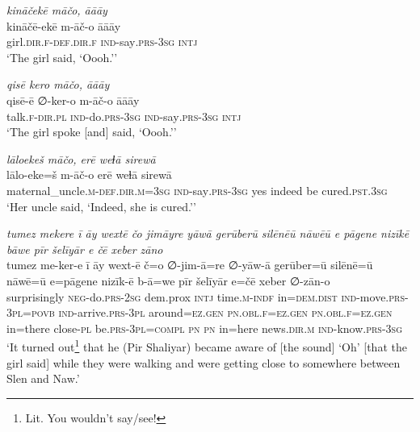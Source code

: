 \ea \label{ŽP.172}
\textit{kināčekē māčo, āāāy} \\ 
\gll kināčē-ekē m-āč-o āāāy \\ 
 girl\textsc{.dir}\textsc{.f}\textsc{-def}\textsc{.dir}\textsc{.f} \textsc{ind-}say\textsc{.prs}\textsc{-3sg} \textsc{intj} \\ 
\glt `The girl said, ‘Oooh.’'
\z 
 
\ea \label{ŽP.173}
\textit{qisē kero māčo, āāāy} \\ 
\gll qisē-ē ∅-ker-o m-āč-o āāāy \\ 
 talk\textsc{.f}\textsc{-dir}\textsc{.pl} \textsc{ind-}do\textsc{.prs}\textsc{-3sg} \textsc{ind-}say\textsc{.prs}\textsc{-3sg} \textsc{intj} \\ 
\glt `The girl spoke [and] said, ‘Oooh.’'
\z 
 
\ea \label{ŽP.174}
\textit{lāloekeš māčo, erē weɫā sirewā} \\ 
\gll lālo-eke=š m-āč-o erē weɫā sirewā \\ 
 maternal\_uncle\textsc{.m}\textsc{-def}\textsc{.dir}\textsc{.m}\textsc{=3sg} \textsc{ind-}say\textsc{.prs}\textsc{-3sg} yes indeed be cured\textsc{.pst}\textsc{.3sg} \\ 
\glt `Her uncle said, ‘Indeed, she is cured.’'
\z 
 
\ea \label{ŽP.175}
\textit{tumez mekere ī āy wextē čo jimāyre yāwā gerūberū silēnēū nāwēū e pāgene nizīkē bāwe pīr šelīyār e čē xeber zāno} \\ 
\gll tumez me-ker-e ī āy wext-ē č=o ∅-jim-ā=re ∅-yāw-ā gerūber=ū silēnē=ū nāwē=ū e=pāgene nizīk-ē b-ā=we pīr šelīyār e=čē xeber ∅-zān-o \\ 
 surprisingly \textsc{neg-}do\textsc{.prs}-\textsc{2sg} dem.prox \textsc{intj} time\textsc{.m}\textsc{-indf} in=\textsc{dem.dist} \textsc{ind-}move\textsc{.prs}\textsc{-3pl}\textsc{=\textsc{povb}} \textsc{ind-}arrive\textsc{.prs}\textsc{-3pl} around\textsc{\textsc{=ez.gen}} \textsc{pn}\textsc{.obl}\textsc{.f}\textsc{\textsc{=ez.gen}} \textsc{pn}\textsc{.obl}\textsc{.f}\textsc{\textsc{=ez.gen}} in=there close\textsc{\textsc{-pl}} be\textsc{.prs}\textsc{-3pl}\textsc{=compl} \textsc{pn} \textsc{pn} in=here news\textsc{.dir}\textsc{.m} \textsc{ind-}know\textsc{.prs}\textsc{-3sg} \\ 
\glt `It turned out\footnote{Lit. You wouldn’t say/see!} that he (Pir Shaliyar) became aware of [the sound] ‘Oh’ [that the girl said] while they were walking and were getting close to somewhere between Slen and Naw.'
\z 
 
